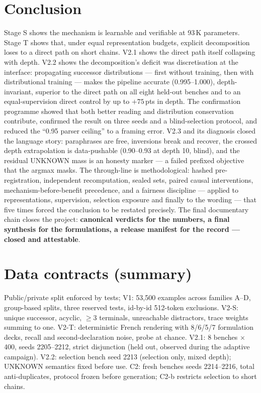 \documentclass[11pt,a4paper]{article}
\begin{document}
\section{Conclusion}

Stage S shows the mechanism is learnable and verifiable at 93\,K parameters. Stage T shows that, under equal representation budgets, explicit decomposition loses to a direct path on short chains. V2.1 shows the direct path itself collapsing with depth. V2.2 shows the decomposition's deficit was discretisation at the interface: propagating successor distributions --- first without training, then with distributional training --- makes the pipeline accurate (0.995--1.000), depth-invariant, superior to the direct path on all eight held-out benches and to an equal-supervision direct control by up to $+75$\,pts in depth. The confirmation programme showed that both better reading and distribution conservation contribute, confirmed the result on three seeds and a blind-selection protocol, and reduced the ``0.95 parser ceiling'' to a framing error. V2.3 and its diagnosis closed the language story: paraphrases are free, inversions break and recover, the crossed depth extrapolation is data-pushable (0.90--0.93 at depth 10, blind), and the residual UNKNOWN mass is an honesty marker --- a failed prefixed objective that the argmax masks. The through-line is methodological: hashed pre-registration, independent recomputation, sealed sets, paired causal interventions, mechanism-before-benefit precedence, and a fairness discipline --- applied to representations, supervision, selection exposure and finally to the wording --- that five times forced the conclusion to be restated precisely. The final documentary chain closes the project: \textbf{canonical verdicts for the numbers, a final synthesis for the formulations, a release manifest for the record --- closed and attestable}.

\appendix

\section{Data contracts (summary)}
Public/private split enforced by tests; V1: 53{,}500 examples across families A--D, group-based splits, three reserved tests, id-by-id 512-token exclusions. V2-S: unique successor, acyclic, $\ge3$ terminals, unreachable distractors, trace weights summing to one. V2-T: deterministic French rendering with 8/6/5/7 formulation decks, recall and second-declaration noise, probe at chance. V2.1: 8 benches $\times$ 400, seeds 2205--2212, strict disjunction (held out, observed during the adaptive campaign). V2.2: selection bench seed 2213 (selection only, mixed depth); UNKNOWN semantics fixed before use. C2: fresh benches seeds 2214--2216, total anti-duplicates, protocol frozen before generation; C2-b restricts selection to short chains.
\end{document}
